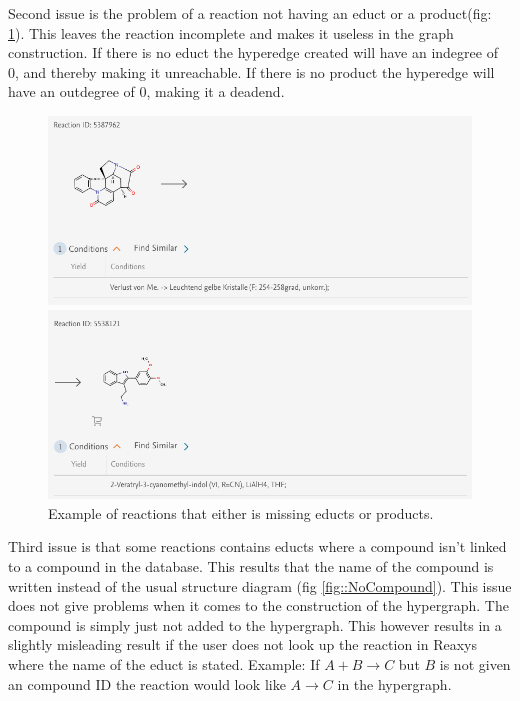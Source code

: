 \documentclass[a4paper,10pt,titlepage]{paper}
\begin{document}
Second issue is the problem of a reaction not having an educt or a product(fig: \ref{fig::EductProductMissing}). This leaves the reaction incomplete and makes it useless in the graph construction. If there is no educt the hyperedge created will have an indegree of 0, and thereby making it unreachable. If there is no product the hyperedge will have an outdegree of 0, making it a deadend.

\begin{figure}[H]
\hspace{-1cm}
\includegraphics[scale=0.5]{Billeder/LeftOnlyReaction.png}

\hspace{-1cm}
\includegraphics[scale=0.5]{Billeder/RightOnlyReaction.png}
\caption{Example of reactions that either is missing educts or products.}
\label{fig::EductProductMissing}
\end{figure}

Third issue is that some reactions contains educts where a compound isn't linked to a compound in the database. This results that the name of the compound is written instead of the usual structure diagram (fig \ref{fig::NoCompound}). This issue does not give problems when it comes to the construction of the hypergraph. The compound is simply just not added to the hypergraph. This however results in a slightly misleading result if the user does not look up the reaction in Reaxys where the name of the educt is stated. Example: If $A+B\rightarrow C$ but $B$ is not given an compound ID the reaction would look like $A\rightarrow C$ in the hypergraph.
\end{document}
